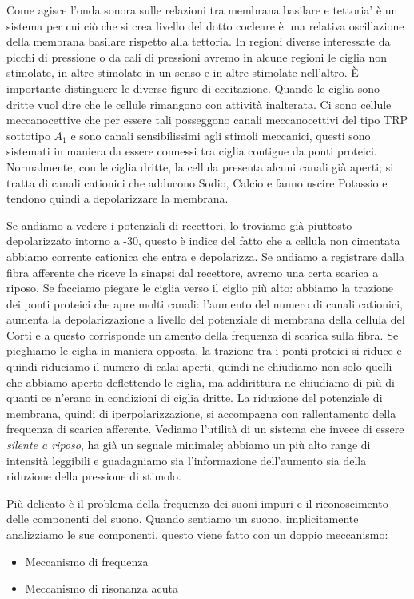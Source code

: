 \documentclass[a4paper,12pt]{article}
\begin{document}
Come agisce l'onda sonora sulle relazioni tra membrana basilare e tettoria' è un sistema per cui ciò che si crea livello del dotto cocleare è una relativa oscillazione della membrana basilare rispetto alla tettoria. In regioni diverse interessate da picchi di pressione o da cali di pressioni avremo in alcune regioni le ciglia non stimolate, in altre stimolate in un senso e in altre stimolate nell'altro. È importante distinguere le diverse figure di eccitazione. Quando le ciglia sono dritte vuol dire che le cellule rimangono con attività inalterata. 
Ci sono cellule meccanocettive che per essere tali posseggono canali meccanocettivi del tipo TRP sottotipo $A_{1}$ e sono canali sensibilissimi agli stimoli meccanici, questi sono sistemati in maniera da essere connessi tra ciglia contigue da ponti proteici. Normalmente, con le ciglia dritte, la cellula presenta alcuni canali già aperti; si tratta di canali cationici che adducono Sodio, Calcio e fanno uscire Potassio e tendono quindi a depolarizzare la membrana. 

Se andiamo a vedere i potenziali di recettori, lo troviamo già piuttosto depolarizzato intorno a -30, questo è indice del fatto che a cellula non cimentata abbiamo corrente cationica che entra e depolarizza. Se andiamo a registrare dalla fibra afferente che riceve la sinapsi dal recettore, avremo una certa scarica a riposo. Se facciamo piegare le ciglia verso il ciglio più alto: abbiamo la trazione dei ponti proteici che apre molti canali: l'aumento del numero di canali cationici, aumenta la depolarizzazione a livello del potenziale di membrana della cellula del Corti e a questo corrisponde un amento della frequenza di scarica sulla fibra. Se pieghiamo le ciglia in maniera opposta, la trazione tra i ponti proteici si riduce e quindi riduciamo il numero di calai aperti, quindi ne chiudiamo non solo quelli che abbiamo aperto deflettendo le ciglia, ma addirittura ne chiudiamo di più di quanti ce n'erano in condizioni di ciglia dritte. La riduzione del potenziale di membrana, quindi di iperpolarizzazione, si accompagna con rallentamento della frequenza di scarica afferente. Vediamo l'utilità di un sistema che invece di essere \emph{silente a riposo}, ha già un segnale minimale; abbiamo un più alto range di intensità leggibili e guadagniamo sia l'informazione dell'aumento sia della riduzione della pressione di stimolo. 

Più delicato è il problema della frequenza dei suoni impuri e il riconoscimento delle componenti del suono. Quando 
sentiamo un suono, implicitamente analizziamo le sue componenti, questo viene fatto con un doppio meccanismo:
\begin{itemize}
\item{Meccanismo di frequenza}
\item{Meccanismo di risonanza acuta}
\end{itemize}
\end{document}
